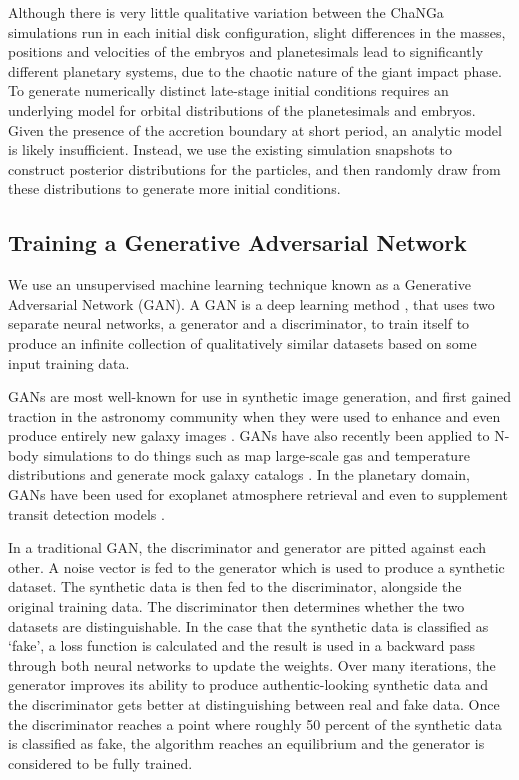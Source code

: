 Although there is very little qualitative variation between the {\sc ChaNGa} simulations run in each initial disk configuration, slight differences in the masses, positions and velocities of the embryos and planetesimals lead to significantly different planetary systems, due to the chaotic nature of the giant impact phase. To generate numerically distinct late-stage initial conditions requires an underlying model for orbital distributions of the planetesimals and embryos. Given the presence of the accretion boundary at short period, an analytic model is likely insufficient. Instead, we use the existing simulation snapshots to construct posterior distributions for the particles, and then randomly draw from these distributions to generate more initial conditions.

\subsection{Training a Generative Adversarial Network}

We use an unsupervised machine learning technique known as a Generative Adversarial Network (GAN). A GAN is a deep learning method \cite{goodfellow14}, that uses two separate neural networks, a generator and a discriminator, to train itself to produce an infinite collection of qualitatively similar datasets based on some input training data.

GANs are most well-known for use in synthetic image generation, and first gained traction in the astronomy community when they were used to enhance \cite{schawinski17} and even produce entirely new galaxy images \cite{dia20}. GANs have also recently been applied to N-body simulations to do things such as map large-scale gas and temperature distributions \cite{troster19} and generate mock galaxy catalogs \cite{jagvaral22}. In the planetary domain, GANs have been used for exoplanet atmosphere retrieval \cite{zingales18} and even to supplement transit detection models \cite{dvash22}.

In a traditional GAN, the discriminator and generator are pitted against each other. A noise vector is fed to the generator which is used to produce a synthetic dataset. The synthetic data is then fed to the discriminator, alongside the original training data. The discriminator then determines whether the two datasets are distinguishable. In the case that the synthetic data is classified as `fake', a loss function is calculated and the result is used in a backward pass through both neural networks to update the weights. Over many iterations, the generator improves its ability to produce authentic-looking synthetic data and the discriminator gets better at distinguishing between real and fake data. Once the discriminator reaches a point where roughly 50 percent of the synthetic data is classified as fake, the algorithm reaches an equilibrium and the generator is considered to be fully trained.

